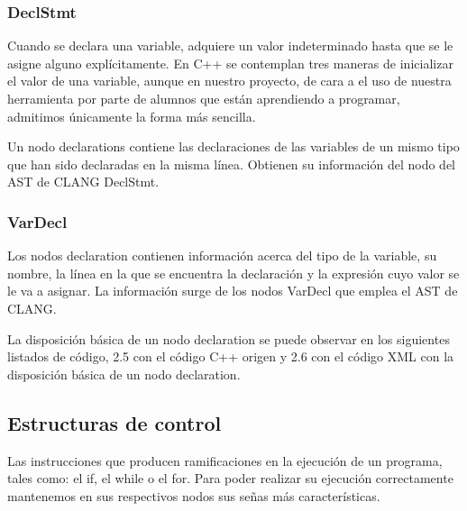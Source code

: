 \subsubsection*{DeclStmt}

Cuando se declara una variable, adquiere un valor indeterminado hasta que se le asigne alguno expl\'icitamente. En C++ se contemplan tres maneras de inicializar el valor de una variable, aunque en nuestro proyecto, de cara a el uso de nuestra herramienta por parte de alumnos que est\'an aprendiendo a programar, admitimos \'unicamente la forma m\'as sencilla.

Un nodo declarations contiene las declaraciones de las variables de un mismo tipo que han sido declaradas en la misma l\'inea. Obtienen su informaci\'on del nodo del AST de CLANG DeclStmt.

\subsubsection*{VarDecl}

Los nodos declaration contienen informaci\'on acerca del tipo de la variable, su nombre, la l\'inea en la que se encuentra la declaraci\'on y la expresi\'on cuyo valor se le va a asignar. La informaci\'on surge de los nodos VarDecl que emplea el AST de CLANG.

La disposici\'on b\'asica de un nodo declaration se puede observar en los siguientes listados de c\'odigo, 2.5 con el c\'odigo C++ origen y 2.6 con el c\'odigo XML con la disposici\'on b\'asica de un nodo declaration.




\subsection{Estructuras de control}

Las instrucciones que producen ramificaciones en la ejecuci\'on de un programa, tales como: el if, el while o el for. Para poder realizar su ejecuci\'on correctamente mantenemos en sus respectivos nodos sus se\~nas m\'as caracter\'isticas.

